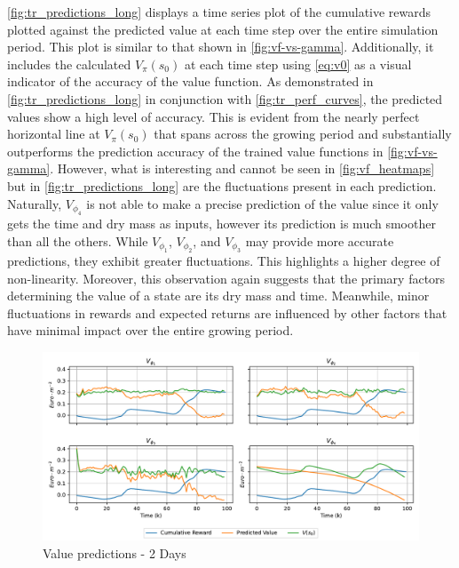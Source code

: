 \autoref{fig:tr_predictions_long} displays a time series plot of the cumulative rewards plotted against the predicted value at each time step over the entire simulation period. This plot is similar to that shown in \autoref{fig:vf-vs-gamma}. Additionally, it includes the calculated $V_\pi (s_0)$ at each time step using \autoref{eq:v0} as a visual indicator of the accuracy of the value function. As demonstrated in \autoref{fig:tr_predictions_long} in conjunction with \autoref{fig:tr_perf_curves}, the predicted values show a high level of accuracy. This is evident from the nearly perfect horizontal line at $V_\pi (s_0)$ that spans across the growing period and substantially outperforms the prediction accuracy of the trained value functions in \autoref{fig:vf-vs-gamma}. However, what is interesting and cannot be seen in \autoref{fig:vf_heatmaps} but in \autoref{fig:tr_predictions_long} are the fluctuations present in each prediction. Naturally, $V_{\phi_4}$ is not able to make a precise prediction of the value since it only gets the time and dry mass as inputs, however its prediction is much smoother than all the others. While $V_{\phi_1}$, $V_{\phi_2}$, and $V_{\phi_3}$ may provide more accurate predictions, they exhibit greater fluctuations. This highlights a higher degree of non-linearity. Moreover, this observation again suggests that the primary factors determining the value of a state are its dry mass and time. Meanwhile, minor fluctuations in rewards and expected returns are influenced by other factors that have minimal impact over the entire growing period.



\begin{figure}[H]
	\centering
	\includegraphics[width = \textwidth]{figures/vf_time_predictions_short.pdf}
	\caption{Value predictions - 2 Days}
	\label{fig:tr_predictions_short}
\end{figure}

